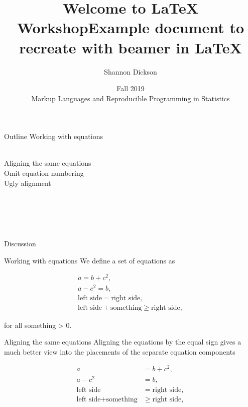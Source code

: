 \documentclass[
  10pt,
  ignorenonframetext,
]{beamer}
\title{Welcome to \LaTeX{} Workshop}
\title{Example document to recreate with beamer in \LaTeX}
\author{Shannon Dickson}
\date{Fall 2019\\
Markup Languages and Reproducible Programming in Statistics}
\begin{document}
\frame{\titlepage}

\begin{frame}{Outline}
\protect\hypertarget{outline}{}
Working with equations\\
\strut \\
\hspace*{0.333em}\hspace*{0.333em}\hspace*{0.333em}\hspace*{0.333em}Aligning
the same equations\\
\hspace*{0.333em}\hspace*{0.333em}\hspace*{0.333em}\hspace*{0.333em}Omit
equation numbering\\
\hspace*{0.333em}\hspace*{0.333em}\hspace*{0.333em}\hspace*{0.333em}Ugly
alignment\\
\strut \\
\strut \\
\strut \\
Discussion
\end{frame}

\begin{frame}{Working with equations}
\protect\hypertarget{working-with-equations}{}
We define a set of equations as

\begin{gather}
a = b + c^2,\\
a - c^2 = b,\\
\textrm{left side} = \textrm{right side},\\
\textrm{left side} + \textrm{something} \geq \textrm{right side}, 
\end{gather}

for all something \textgreater{} 0.
\end{frame}

\begin{frame}{Aligning the same equations}
\protect\hypertarget{aligning-the-same-equations}{}
Aligning the equations by the equal sign gives a much better view into
the placements of the separate equation components

\begin{align} 
a &= b + c^2,\\
a - c^2 &= b,\\
\textrm{left side} &= \textrm{right side},\\
\textrm{left side} + \textrm{something} &\geq \textrm{right side},
\end{align}
\end{frame}
\end{document}
